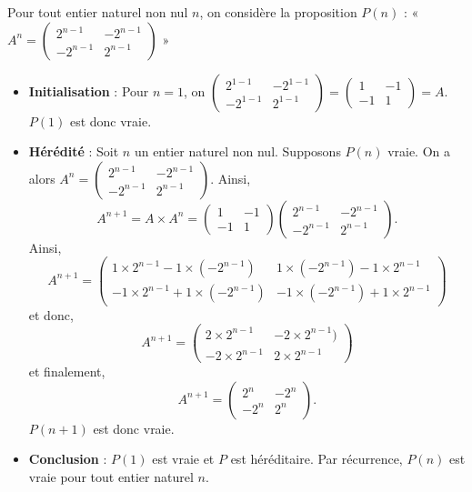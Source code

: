 \documentclass[11pt,fleqn]{book} %
\begin{document}
\begin{solution}Pour tout entier naturel non nul \(n\), on considère la proposition \(P(n)\) : « \(A^n = \begin{pmatrix} 2^{n-1} & -2^{n-1} \\ -2^{n-1} & 2^{n-1}\end{pmatrix}\) »
\begin{itemize}\item \textbf{Initialisation} : Pour \(n=1\), on \(\begin{pmatrix} 2^{1-1} & -2^{1-1} \\ -2^{1-1} & 2^{1-1}\end{pmatrix}= \begin{pmatrix} 1 & -1 \\ -1 & 1\end{pmatrix}=A\). \(P(1)\) est donc vraie.
	\item \textbf{Hérédité} : Soit \(n\) un entier naturel non nul. Supposons \(P(n)\) vraie. On a alors \(A^n = \begin{pmatrix} 2^{n-1} & -2^{n-1} \\ -2^{n-1} & 2^{n-1}\end{pmatrix}\). Ainsi,
		\[A^{n+1} = A \times A^n = \begin{pmatrix} 1 & -1 \\ -1 & 1\end{pmatrix}\begin{pmatrix} 2^{n-1} & -2^{n-1} \\ -2^{n-1} & 2^{n-1}\end{pmatrix}.\]
		Ainsi,
		\[A^{n+1} = \begin{pmatrix} 1 \times 2^{n-1} -1 \times(-2^{n-1}) & 1 \times (-2^{n-1}) -1 \times 2^{n-1} \\ -1 \times 2^{n-1} +1 \times (-2^{n-1}) & -1 \times (-2^{n-1}) + 1 \times 2^{n-1} \end{pmatrix}  \]
		et donc,
		\[A^{n+1} = \begin{pmatrix} 2 \times 2^{n-1}  & -2\times 2^{n-1})  \\ -2 \times 2^{n-1}  &  2 \times 2^{n-1} \end{pmatrix}  \]
		et finalement,
		\[A^{n+1} = \begin{pmatrix} 2^{n}  & - 2^{n}  \\ -2^{n}  &  2^{n}\end{pmatrix}.\]
	 \(P(n+1)\) est donc vraie.
	\item \textbf{Conclusion }: \(P(1)\) est vraie et \(P\) est héréditaire. Par récurrence, \(P(n)\) est vraie pour tout entier  naturel \(n\).\end{itemize}
\end{solution}
\end{document}
